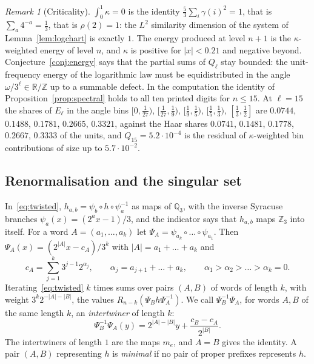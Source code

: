 \documentclass[11pt]{article}
\theoremstyle{remark}
\newtheorem{remark}[theorem]{Remark}
\newcommand{\Z}{\mathbb Z}
\begin{document}
\begin{remark}[Criticality]\label{rem:criticality}
$\int_0^1\kappa=0$ is the identity $\frac53\sum_i\gamma(i)^2=1$, that is $\sum_a4^{-a}=\frac13$, that is $\rho(2)=1$: the $L^2$ similarity dimension of the system of Lemma~\ref{lem:logchart} is exactly $1$. The energy produced at level $n+1$ is the $\kappa$-weighted energy of level $n$, and $\kappa$ is positive for $|x|<0.21$ and negative beyond. Conjecture~\ref{conj:energy} says that the partial sums of $Q_\ell$ stay bounded: the unit-frequency energy of the logarithmic law must be equidistributed in the angle $\omega/3^\ell\in\mathbb R/\Z$ up to a summable defect. In the computation the identity of Proposition~\ref{prop:spectral} holds to all ten printed digits for $n\le15$. At $\ell=15$ the shares of $E_\ell$ in the angle bins $[0,\frac1{27})$, $[\frac1{27},\frac19)$, $[\frac19,\frac15)$, $[\frac15,\frac13)$, $[\frac13,\frac12]$ are $0.0744$, $0.1488$, $0.1781$, $0.2665$, $0.3321$, against the Haar shares $0.0741$, $0.1481$, $0.1778$, $0.2667$, $0.3333$ of the units, and $Q_{15}=5.2\cdot10^{-4}$ is the residual of $\kappa$-weighted bin contributions of size up to $5.7\cdot10^{-2}$.
\end{remark}

\subsection*{Renormalisation and the singular set}
In~\eqref{eq:twisted}, $h_{a,b}=\psi_b\circ h\circ\psi_a^{-1}$ as maps of $\mathbb Q_3$, with the inverse Syracuse branches $\psi_a(x)=(2^ax-1)/3$, and the indicator says that $h_{a,b}$ maps $\Z_3$ into itself. For a word $A=(a_1,\dots,a_k)$ let $\Psi_A=\psi_{a_k}\circ\dots\circ\psi_{a_1}$. Then $\Psi_A(x)=(2^{|A|}x-c_A)/3^k$ with $|A|=a_1+\dots+a_k$ and
\[
 c_A=\sum_{j=1}^k3^{j-1}2^{\alpha_j},\qquad \alpha_j=a_{j+1}+\dots+a_k,\qquad \alpha_1>\alpha_2>\dots>\alpha_k=0 .
\]
Iterating~\eqref{eq:twisted} $k$ times sums over pairs $(A,B)$ of words of length $k$, with weight $3^k2^{-|A|-|B|}$, the values $R_{n-k}(\Psi_Bh\Psi_A^{-1})$. We call $\Psi_B^{-1}\Psi_A$, for words $A,B$ of the same length $k$, an \emph{intertwiner} of length $k$:
\[
 \Psi_B^{-1}\Psi_A(y)=2^{|A|-|B|}y+\frac{c_B-c_A}{2^{|B|}} .
\]
The intertwiners of length $1$ are the maps $m_e$, and $A=B$ gives the identity. A pair $(A,B)$ representing $h$ is \emph{minimal} if no pair of proper prefixes represents $h$.
\end{document}
